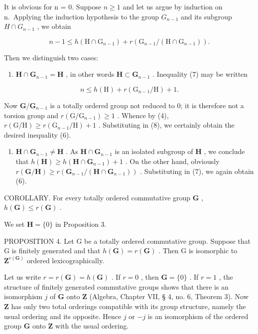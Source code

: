 It is obvious for n = 0. Suppose \(n \geqslant 1\) and let us argue by induction on n.~Applying the induction hypothesis to the group \(G_{n-1}\) and its subgroup \(H \cap G_{n-1}\) , we obtain

\[
n - 1 \leqslant h (\mathrm{H} \cap \mathrm{G} _ {n - 1}) + r (\mathrm{G} _ {n - 1} / (\mathrm{H} \cap \mathrm{G} _ {n - 1})).\tag{7}
\]

Then we distinguish two cases:

\begin{enumerate}
\def\labelenumi{(\alph{enumi})}
\tightlist
\item
  \(\mathbf{H} \cap \mathbf{G}_{n-1} = \mathbf{H}\) , in other words \(\mathbf{H} \subset \mathbf{G}_{n-1}\) . Inequality (7) may be written
\end{enumerate}

\[
n \leqslant h (\mathrm{H}) + r (\mathrm{G} _ {n - 1} / \mathrm{H}) + 1.\tag{8}
\]

Now \(\mathbf{G} / \mathbf{G}_{n - 1}\) is a totally ordered group not reduced to 0; it is therefore not a torsion group and \(r(\mathrm{G} / \mathrm{G}_{n - 1}) \geqslant 1\) . Whence by (4), \(r(\mathrm{G} / \mathrm{H}) \geqslant r(\mathrm{G}_{n - 1} / \mathrm{H}) + 1\) . Substituting in (8), we certainly obtain the desired inequality (6).

\begin{enumerate}
\def\labelenumi{(\alph{enumi})}
\setcounter{enumi}{1}
\tightlist
\item
  \(\mathbf{H} \cap \mathbf{G}_{n-1} \neq \mathbf{H}\) . As \(\mathbf{H} \cap \mathbf{G}_{n-1}\) is an isolated subgroup of \(\mathbf{H}\) , we conclude that \(h(\mathbf{H}) \geqslant h(\mathbf{H} \cap \mathbf{G}_{n-1}) + 1\) . On the other hand, obviously \(r(\mathbf{G}/\mathbf{H}) \geqslant r(\mathbf{G}_{n-1}/(\mathbf{H} \cap \mathbf{G}_{n-1}))\) . Substituting in (7), we again obtain (6).
\end{enumerate}

COROLLARY. For every totally ordered commutative group \(\mathbf{G}\) , \(h(\mathbf{G}) \leqslant r(\mathbf{G})\) .

We set \(\mathbf{H} = \{0\}\) in Proposition 3.

PROPOSITION 4. Let G be a totally ordered commutative group. Suppose that G is finitely generated and that \(h(\mathbf{G}) = r(\mathbf{G})\) . Then G is isomorphic to \(\mathbf{Z}^{r(\mathbf{G})}\) ordered lexicographically.

Let us write \(r = r(\mathbf{G}) = h(\mathbf{G})\) . If \(r = 0\) , then \(\mathbf{G} = \{0\}\) . If \(r = 1\) , the structure of finitely generated commutative groups shows that there is an isomorphism \(j\) of \(\mathbf{G}\) onto \(\mathbf{Z}\) (Algebra, Chapter VII, § 4, no. 6, Theorem 3). Now \(\mathbf{Z}\) has only two total orderings compatible with its group structure, namely the usual ordering and its opposite. Hence \(j\) or \(-j\) is an isomorphism of the ordered group \(\mathbf{G}\) onto \(\mathbf{Z}\) with the usual ordering.

